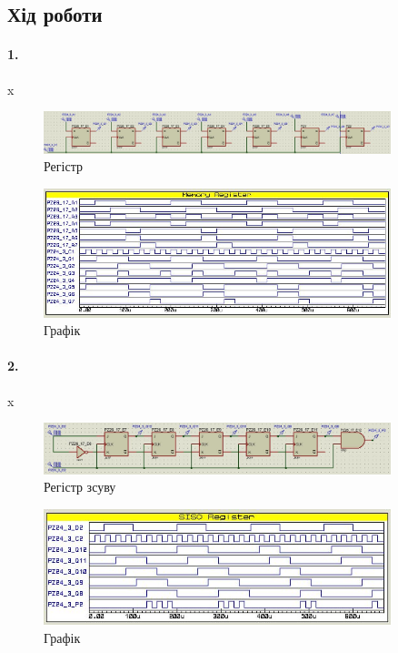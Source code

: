 \documentclass[12pt]{extarticle}
\begin{document}
\subsection*{Хід роботи}
\paragraph{1.}x

\vspace{12pt}
\begin{figure}[H]
    \centering
    \includegraphics[width=0.90\textwidth]{register.jpg}
    \caption{Регістр}
\end{figure}
\begin{figure}[H]
    \centering
    \includegraphics[width=0.90\textwidth]{register_graph.jpg}
    \caption{Графік}
\end{figure}

\paragraph{2.}x
\begin{figure}[H]
    \centering
    \includegraphics[width=0.90\textwidth]{shift.jpg}
    \caption{Регістр зсуву}
\end{figure}
\begin{figure}[H]
    \centering
    \includegraphics[width=0.90\textwidth]{shift_graph.jpg}
    \caption{Графік}
\end{figure}
\end{document}
